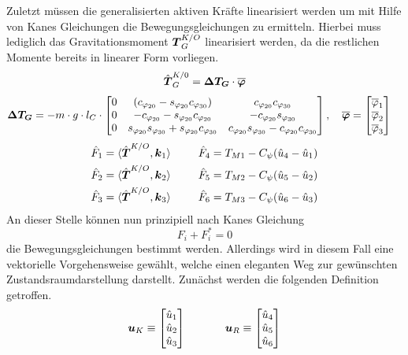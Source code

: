 Zuletzt müssen die generalisierten aktiven Kräfte linearisiert werden um mit Hilfe von Kanes Gleichungen die Bewegungsgleichungen zu ermitteln. Hierbei muss lediglich das Gravitationsmoment $\boldsymbol{T}^{K/O}_G$ linearisiert werden, da die restlichen Momente bereits in linearer Form vorliegen.
\begin{align}
\hat{\boldsymbol{T}}^{K/0}_G = \boldsymbol{\Delta T_G} \cdot \boldsymbol{\overline{\varphi}}
\end{align}
\begin{align*}
\boldsymbol{\Delta T_G} = -m\cdot g\cdot l_C\cdot \begin{bmatrix}
0 & (c_{\varphi_{20}}-s_{\varphi_{20}}c_{\varphi_{30}}) & c_{\varphi_{20}}c_{\varphi_{30}} 
\\
0 & -c_{\varphi_{20}}-s_{\varphi_{20}}c_{\varphi_{20}} & -c_{\varphi_{20}}s_{\varphi_{30}} 
\\
0 & s_{\varphi_{20}}s_{\varphi_{30}}+s_{\varphi_{20}}c_{\varphi_{30}} & c_{\varphi_{20}}s_{\varphi_{30}}-c_{\varphi_{20}}c_{\varphi_{30}}
\end{bmatrix},\hspace{10pt}
\boldsymbol{\overline{\varphi}}&= \begin{bmatrix}
\overline{\varphi}_1 \\ \overline{\varphi}_2 \\ \overline{\varphi}_3
\end{bmatrix} \nonumber
\end{align*}
\begin{align}
\hat{F}_1 &= \langle {\hat{\boldsymbol{T}}^{K/O}}, {\boldsymbol{k}_1} \rangle &&\hspace{15pt}\hat{F}_4 = T_{M1} - C_{\psi}(\hat{u}_4 - \hat{u}_1)
\\
\hat{F}_2 &= \langle {\hat{\boldsymbol{T}}^{K/O}}, {\boldsymbol{k}_2} \rangle &&\hspace{15pt}\hat{F}_5 = T_{M2} - C_{\psi}(\hat{u}_5 - \hat{u}_2)
\\
\hat{F}_3 &= \langle {\hat{\boldsymbol{T}}^{K/O}}, {\boldsymbol{k}_3} \rangle &&\hspace{15pt}\hat{F}_6 = T_{M3} - C_{\psi}(\hat{u}_6 - \hat{u}_3)
\end{align}
An dieser Stelle können nun prinzipiell nach Kanes Gleichung
\begin{equation}
F_i + F^*_i = 0
\end{equation}
die Bewegungsgleichungen bestimmt werden. Allerdings wird in diesem Fall eine vektorielle Vorgehensweise gewählt, welche einen eleganten Weg zur gewünschten Zustandsraumdarstellung darstellt. Zunächst werden die folgenden Definition getroffen.
\begin{equation}
\boldsymbol{u}_K \equiv \begin{bmatrix} \hat{u}_1 \\ \hat{u}_2 \\ \hat{u}_3 \end{bmatrix}
\hspace{35pt}
\boldsymbol{u}_R \equiv \begin{bmatrix} \hat{u}_4 \\ \hat{u}_5 \\ \hat{u}_6 \end{bmatrix}
\end{equation}
